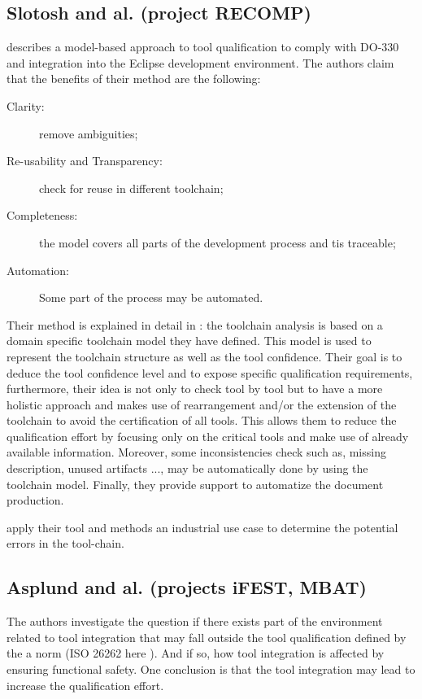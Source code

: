 \subsection{Slotosh and al. (project RECOMP)}
\label{sec-1-2.1}

 \cite{slotosch_model-based_2012} describes a model-based approach to tool
 qualification to comply with DO-330 and integration into the Eclipse
 development environment. The authors claim that the benefits of their
 method  are the following:

\begin{description}
\item[Clarity:] remove ambiguities;
\item[Re-usability and Transparency:] check for reuse in different toolchain;
\item[Completeness:] the model covers all parts of the  development
  process and tis traceable;
\item[Automation:] Some part of the process may be automated.
\end{description}

Their method is explained in detail in \cite{slotosch_iso_2012}: the
toolchain analysis is based on a domain specific toolchain model
they have defined. This model is used to represent the toolchain
structure as well as the tool confidence.  Their goal is to deduce the
tool confidence level and to expose specific qualification
requirements, furthermore, their idea is not only to check tool by
tool but to have a more holistic approach and makes use of
rearrangement and/or the extension of the toolchain to avoid the
certification of all tools. This allows them to reduce the
qualification effort by focusing only on the critical tools and make
use of already available information.  Moreover, some inconsistencies
check such as, missing description, unused artifacts ..., may be
automatically done by using the toolchain model. Finally, they
provide support to automatize the document production.

\cite{wildmoser_determining_2012} apply their tool and methods an
industrial use case to determine the potential errors in the tool-chain.

\subsection{Asplund and al. (projects iFEST, MBAT)}
\label{sec-1-2.2}

The authors investigate the question if there exists part of the environment related to tool
integration that may fall outside the tool qualification defined by the a norm
(ISO 26262 here \cite{asplund_qualifying_2012}). And if so, how tool integration
is affected by ensuring functional safety. One conclusion is that the tool
integration may lead to increase the qualification effort.

